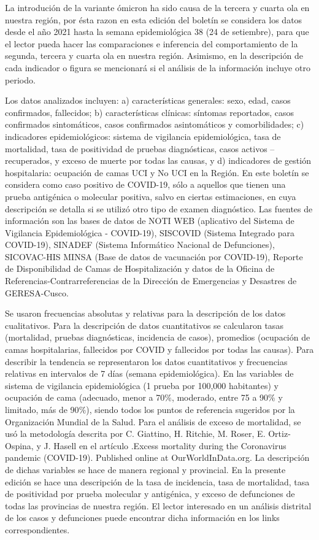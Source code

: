 \documentclass[12pt,a4paper,openany]{book}
\begin{document}
	La introdución de la variante ómicron ha sido causa de la tercera y cuarta ola en nuestra región, por ésta razon en esta edición del boletín se considera los datos desde el año 2021 hasta la
	semana epidemiológica  38 (24 de setiembre), para que el lector pueda hacer las comparaciones
	e inferencia del comportamiento de la segunda, tercera y cuarta ola en nuestra región. Asimismo, en la descripción de cada indicador o figura se mencionará si el análisis de
	la información incluye otro periodo.
	
	Los datos analizados incluyen: a) características generales: sexo, edad, casos confirmados,
	fallecidos; b) características clínicas: síntomas reportados, casos confirmados sintomáticos, casos
	confirmados asintomáticos y comorbilidades; c) indicadores epidemiológicos: sistema de vigilancia
	epidemiológica, tasa de mortalidad, tasa de positividad de pruebas diagnósticas, casos activos –
	recuperados, y exceso de muerte por todas las causas, y d) indicadores de gestión hospitalaria: 
	ocupación de camas UCI y No UCI en la Región. En este boletín se considera como caso positivo de
	COVID-19, sólo a aquellos que tienen una prueba antigénica o molecular positiva, salvo en ciertas
	estimaciones, en cuya descripción se detalla si se utilizó otro tipo de examen diagnóstico.
	Las fuentes de información son las bases de datos de NOTI WEB (aplicativo del Sistema de
	Vigilancia Epidemiológica - COVID-19), SISCOVID (Sistema Integrado para COVID-19), SINADEF
	(Sistema Informático Nacional de Defunciones), SICOVAC-HIS MINSA (Base de datos de vacunación
	por COVID-19), Reporte de Disponibilidad de Camas de Hospitalización y datos de la Oficina de
	Referencias-Contrarreferencias de la Dirección de Emergencias y Desastres de GERESA-Cusco.

	Se usaron frecuencias absolutas y relativas para la descripción de los datos cualitativos. Para la
	descripción de datos cuantitativos se calcularon tasas (mortalidad, pruebas diagnósticas, incidencia de
	casos), promedios (ocupación de camas hospitalarias, fallecidos por COVID y fallecidos por todas las
	causas). Para describir la tendencia se representaron los datos cuantitativos y frecuencias relativas en
	intervalos de 7 días (semana epidemiológica). En las variables de sistema de vigilancia epidemiológica
		(1 prueba por 100,000 habitantes) y ocupación de cama (adecuado, menor a 70$\%$, moderado,
	entre 75 a 90$\%$ y limitado, más de 90$\%$), siendo todos los puntos de referencia sugeridos por la
	Organización Mundial de la Salud. Para el análisis de exceso de mortalidad, se usó la metodología
	descrita por C. Giattino, H. Ritchie, M. Roser, E. Ortiz-Ospina, y J. Hasell en el artículo .Excess
	mortality during the Coronavirus pandemic (COVID-19). Published online at OurWorldInData.org.
	La descripción de dichas variables se hace de manera regional y provincial. En la presente edición
	se hace una descripción de la tasa de incidencia, tasa de mortalidad, tasa de positividad por prueba
	molecular y antigénica, y exceso de defunciones de todas las provincias de nuestra región. El lector
	interesado en un análisis distrital de los casos y defunciones puede encontrar dicha información en
	los links correspondientes.
	
\end{document}
